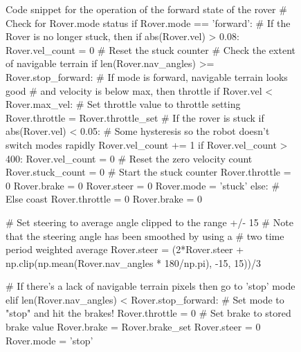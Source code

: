 \documentclass[a4paper]{article}
\begin{document}
\begin{figure}[h]\scriptsize
\begin{sexylisting}{Code snippet for the operation of the forward state of the rover}
# Check for Rover.mode status
        if Rover.mode == 'forward':
            # If the Rover is no longer stuck, then 
            if abs(Rover.vel) > 0.08:
                Rover.vel_count = 0 # Reset the stuck counter
            # Check the extent of navigable terrain
            if len(Rover.nav_angles) >= Rover.stop_forward:  
                # If mode is forward, navigable terrain looks good 
                # and velocity is below max, then throttle 
                if Rover.vel < Rover.max_vel:
                    # Set throttle value to throttle setting
                    Rover.throttle = Rover.throttle_set
                    # If the rover is stuck
                    if abs(Rover.vel) < 0.05:
                        # Some hysteresis so the robot doesn't switch modes rapidly
                        Rover.vel_count += 1
                        if Rover.vel_count > 400:
                            Rover.vel_count = 0 # Reset the zero velocity count
                            Rover.stuck_count = 0 # Start the stuck counter
                            Rover.throttle = 0
                            Rover.brake = 0
                            Rover.steer = 0
                            Rover.mode = 'stuck'
                else: # Else coast
                    Rover.throttle = 0
                Rover.brake = 0
                
                # Set steering to average angle clipped to the range +/- 15
                # Note that the steering angle has been smoothed by using a
                # two time period weighted average
                Rover.steer =
	                (2*Rover.steer +
		                 np.clip(np.mean(Rover.nav_angles * 180/np.pi), -15, 15))/3
                
            # If there's a lack of navigable terrain pixels then go to 'stop' mode
            elif len(Rover.nav_angles) < Rover.stop_forward:
                    # Set mode to "stop" and hit the brakes!
                    Rover.throttle = 0
                    # Set brake to stored brake value
                    Rover.brake = Rover.brake_set
                    Rover.steer = 0
                    Rover.mode = 'stop'
\end{sexylisting}
\end{figure}
\end{document}
